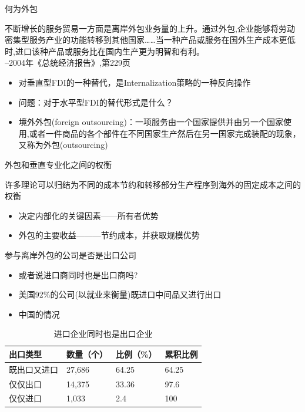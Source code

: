 \documentclass[10pt,hyperref={CJKbookmarks=true},xcolor=dvipsnames,aspectratio=169]{beamer}
\begin{document}
\begin{frame}{何为外包}

 \begin{block}{}
	不断增长的服务贸易一方面是离岸外包业务量的上升。通过外包,企业能够将劳动密集型服务产业的功能转移到其他国家……当一种产品或服务在国外生产成本更低时,进口该种产品或服务比在国内生产更为明智和有利。\\
	--2004年《总统经济报告》,第229页
	
\end{block}
  \begin{itemize}
  	\item 对垂直型FDI的一种替代，是Internalization策略的一种反向操作
  	\item 问题：对于水平型FDI的替代形式是什么？
    \item 境外外包(foreign outsourcing)：一项服务由一个国家提供并由另一个国家使用,或者一件商品的各个部件在不同国家生产然后在另一国家完成装配的现象，又称为外包(outsourcing)
    
  \end{itemize}

\end{frame}

\begin{frame}{外包和垂直专业化之间的权衡}
 \begin{block}{}
 	许多理论可以归结为不同的成本节约和转移部分生产程序到海外的固定成本之间的权衡
 \end{block}
  \begin{itemize}
  	\item 决定内部化的关键因素——所有者优势
  	\item 外包的主要收益———节约成本，并获取规模优势
  \end{itemize}
\end{frame}

\begin{frame}{参与离岸外包的公司是否是出口公司}
	\begin{itemize}
		\item 或者说进口商同时也是出口商吗?
		\item 美国92\%的公司(以就业来衡量)既进口中间品又进行出口
		\item 中国的情况
	\end{itemize}
	\begin{table}
		\centering
		\caption{进口企业同时也是出口企业}
		\begin{tabular}{llll} 
			\hline
			出口类型   & 数量（个）  & 比例（\%） & 累积比例   \\ 
			\hline
			既出口又进口 & 27,686 & 64.25  & 64.25  \\
			仅仅出口   & 14,375 & 33.36  & 97.6   \\
			仅仅进口   & 1,033  & 2.4    & 100    \\
			\hline
		\end{tabular}
	\end{table}
\end{frame}
\end{document}
